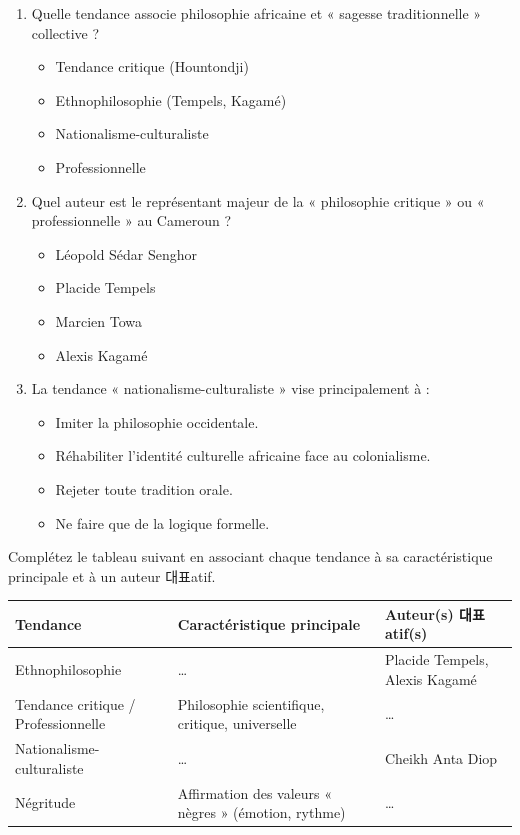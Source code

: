 \documentclass[11pt]{article}
\begin{document}
\begin{exercice}
\begin{enumerate}
    \item Quelle tendance associe philosophie africaine et « sagesse traditionnelle » collective ?
    \begin{itemize}
        \item[A.] Tendance critique (Hountondji)
        \item[B.] Ethnophilosophie (Tempels, Kagamé)
        \item[C.] Nationalisme-culturaliste
        \item[D.] Professionnelle
    \end{itemize}
    \item Quel auteur est le représentant majeur de la « philosophie critique » ou « professionnelle » au Cameroun ?
    \begin{itemize}
        \item[A.] Léopold Sédar Senghor
        \item[B.] Placide Tempels
        \item[C.] Marcien Towa
        \item[D.] Alexis Kagamé
    \end{itemize}
    \item La tendance « nationalisme-culturaliste » vise principalement à :
    \begin{itemize}
        \item[A.] Imiter la philosophie occidentale.
        \item[B.] Réhabiliter l'identité culturelle africaine face au colonialisme.
        \item[C.] Rejeter toute tradition orale.
        \item[D.] Ne faire que de la logique formelle.
    \end{itemize}
\end{enumerate}
\end{exercice}

\begin{exercice}
Complétez le tableau suivant en associant chaque tendance à sa caractéristique principale et à un auteur 대표atif.

\begin{tabular}{|l|l|l|}
\hline
\textbf{Tendance} & \textbf{Caractéristique principale} & \textbf{Auteur(s) 대표atif(s)} \\
\hline
Ethnophilosophie & \ldots & Placide Tempels, Alexis Kagamé \\
\hline
Tendance critique / Professionnelle & Philosophie scientifique, critique, universelle & \ldots \\
\hline
Nationalisme-culturaliste & \ldots & Cheikh Anta Diop \\
\hline
Négritude & Affirmation des valeurs « nègres » (émotion, rythme) & \ldots \\
\hline
\end{tabular}
\end{exercice}
\end{document}
